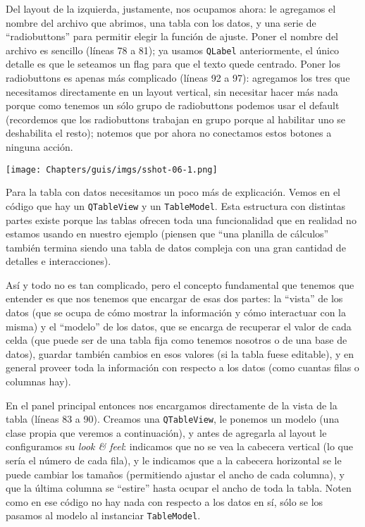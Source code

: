 Del layout de la izquierda, justamente, nos ocupamos ahora: le agregamos el nombre del archivo que abrimos, una tabla con los datos, y una serie de ``radiobuttons'' para permitir elegir la función de ajuste. Poner el nombre del archivo es sencillo (líneas 78 a 81); ya usamos \texttt{QLabel} anteriormente, el único detalle es que le seteamos un flag para que el texto quede centrado. Poner los radiobuttons es apenas más complicado (líneas 92 a 97): agregamos los tres que necesitamos directamente en un layout vertical, sin necesitar hacer más nada porque como tenemos un sólo grupo de radiobuttons podemos usar el default (recordemos que los radiobuttons trabajan en grupo porque al habilitar uno se deshabilita el resto); notemos que por ahora no conectamos estos botones a ninguna acción.

\begin{center}
    \texttt{[image: Chapters/guis/imgs/sshot-06-1.png]}
\end{center}

Para la tabla con datos necesitamos un poco más de explicación. Vemos en el código que hay un \texttt{QTableView} y un \texttt{TableModel}. Esta estructura con distintas partes existe porque las tablas ofrecen toda una funcionalidad que en realidad no estamos usando en nuestro ejemplo (piensen que ``una planilla de cálculos'' también termina siendo una tabla de datos compleja con una gran cantidad de detalles e interacciones).

Así y todo no es tan complicado, pero el concepto fundamental que tenemos que entender es que nos tenemos que encargar de esas dos partes: la ``vista'' de los datos (que se ocupa de cómo mostrar la información y cómo interactuar con la misma) y el ``modelo'' de los datos, que se encarga de recuperar el valor de cada celda (que puede ser de una tabla fija como tenemos nosotros o de una base de datos), guardar también cambios en esos valores (si la tabla fuese editable), y en general proveer toda la información con respecto a los datos (como cuantas filas o columnas hay).

En el panel principal entonces nos encargamos directamente de la vista de la tabla (líneas 83 a 90). Creamos una \texttt{QTableView}, le ponemos un modelo (una clase propia que veremos a continuación), y antes de agregarla al layout le configuramos su \textit{look \& feel}: indicamos que no se vea la cabecera vertical (lo que sería el número de cada fila), y le indicamos que a la cabecera horizontal se le puede cambiar los tamaños (permitiendo ajustar el ancho de cada columna), y que la última columna se ``estire'' hasta ocupar el ancho de toda la tabla. Noten como en ese código no hay nada con respecto a los datos en sí, sólo se los pasamos al modelo al instanciar \texttt{TableModel}.

